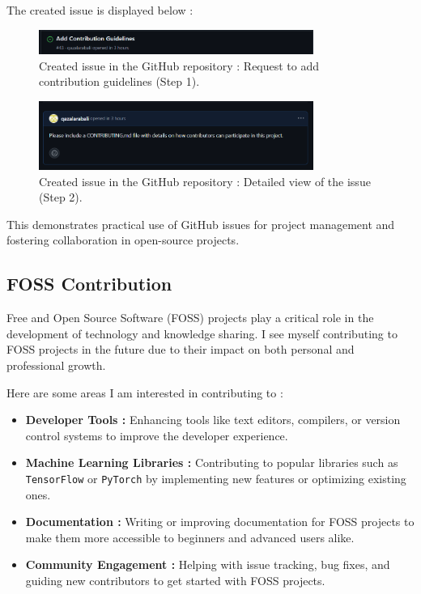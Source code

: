 \documentclass[12pt]{article}
\begin{document}
            The created issue is displayed below :

            \begin{figure}[H]
                \centering
                \includegraphics[width=0.8\textwidth]{assets/pictures/Requestـtoـaddـcontributionـguidelines.png}
                \caption{Created issue in the GitHub repository : Request to add contribution guidelines (Step 1).}
            \end{figure}

            \begin{figure}[H]
                \centering
                \includegraphics[width=0.8\textwidth]{assets/pictures/Detailedـviewـofـtheـissue.png}
                \caption{Created issue in the GitHub repository : Detailed view of the issue (Step 2).}
            \end{figure}

            This demonstrates practical use of GitHub issues for project management and fostering collaboration in open-source projects.

        \subsection{FOSS Contribution}

            Free and Open Source Software (FOSS) projects play a critical role in the development of technology and knowledge sharing. I see myself contributing to FOSS projects in the future due to their impact on both personal and professional growth. 
            
            Here are some areas I am interested in contributing to :
            \begin{itemize}
                \item \textbf{Developer Tools :} Enhancing tools like text editors, compilers, or version control systems to improve the developer experience.
                \item \textbf{Machine Learning Libraries :} Contributing to popular libraries such as \texttt{TensorFlow} or \texttt{PyTorch} by implementing new features or optimizing existing ones.
                \item \textbf{Documentation :} Writing or improving documentation for FOSS projects to make them more accessible to beginners and advanced users alike.
                \item \textbf{Community Engagement :} Helping with issue tracking, bug fixes, and guiding new contributors to get started with FOSS projects.
            \end{itemize}
            
\end{document}
